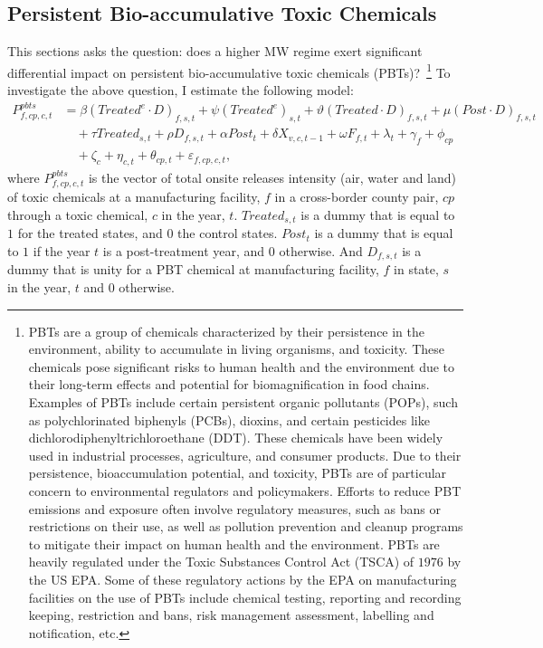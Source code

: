 \documentclass[12pt, english]{article}
\begin{document}
    \subsection{Persistent Bio-accumulative Toxic Chemicals}\label{subsec:persistent-bioaccumulative-toxic-chemicals}
    This sections asks the question: does a higher MW regime exert significant differential impact on persistent bio-accumulative toxic chemicals (PBTs)?~\footnote{\tiny PBTs are a group of chemicals characterized by their persistence in the environment, ability to accumulate in living organisms, and toxicity. These chemicals pose significant risks to human health and the environment due to their long-term effects and potential for biomagnification in food chains. Examples of PBTs include certain persistent organic pollutants (POPs), such as polychlorinated biphenyls (PCBs), dioxins, and certain pesticides like dichlorodiphenyltrichloroethane (DDT). These chemicals have been widely used in industrial processes, agriculture, and consumer products. Due to their persistence, bioaccumulation potential, and toxicity, PBTs are of particular concern to environmental regulators and policymakers. Efforts to reduce PBT emissions and exposure often involve regulatory measures, such as bans or restrictions on their use, as well as pollution prevention and cleanup programs to mitigate their impact on human health and the environment. PBTs are heavily regulated under the Toxic Substances Control Act (TSCA) of $1976$ by the US EPA. Some of these regulatory actions by the EPA on manufacturing facilities on the use of PBTs include chemical testing, reporting and recording keeping, restriction and bans, risk management assessment, labelling and notification, etc.} To investigate the above question, I estimate the following model:
    \begin{align}
        P_{f,cp,c,t}^{pbts} &= \beta (Treated^{e} \cdot D)_{f,s,t} + \psi (Treated^{e})_{s,t} + \vartheta (Treated \cdot D)_{f,s,t} + \mu (Post \cdot D)_{f,s,t} \nonumber \\
        &\quad + \tau Treated_{s,t} + \rho D_{f,s,t} + \alpha Post_{t} + \delta X_{v,c,t-1} + \omega F_{f,t} + \lambda_{t} + \gamma_{f} + \phi_{cp} \nonumber \\
        &\quad + \zeta_{c} + \eta_{c,t} + \theta_{cp,t} + \varepsilon_{f,cp,c,t},\label{eq:heterogeneous-onsite-releases-intensity-pbts}
    \end{align}
    where $P_{f,cp,c,t}^{pbts}$ is the vector of total onsite releases intensity (air, water and land) of toxic chemicals at a manufacturing facility, $f$ in a cross-border county pair, $cp$ through a toxic chemical, $c$ in the year, $t$. $Treated_{s,t}$ is a dummy that is equal to $1$ for the treated states, and $0$ the control states. $Post_{t}$ is a dummy that is equal to $1$ if the year $t$ is a post-treatment year, and $0$ otherwise. And $D_{f,s,t}$ is a dummy that is unity for a PBT chemical at manufacturing facility, $f$ in state, $s$ in the year, $t$ and $0$ otherwise.
    
\end{document}
